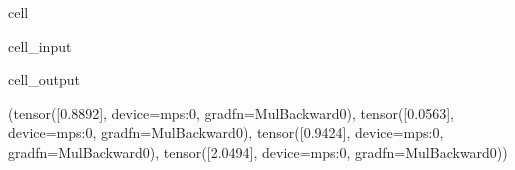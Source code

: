 \documentclass[letterpaper,10pt,english]{jupyterBook}
\begin{document}
\begin{sphinxuseclass}{cell}\begin{sphinxVerbatimInput}

\begin{sphinxuseclass}{cell_input}
\begin{sphinxVerbatim}[commandchars=\\\{\}]
              
              
          
          

   
\end{sphinxVerbatim}

\end{sphinxuseclass}\end{sphinxVerbatimInput}
\begin{sphinxVerbatimOutput}

\begin{sphinxuseclass}{cell_output}
\begin{sphinxVerbatim}[commandchars=\\\{\}]
(tensor([\PYGZhy{}0.8892], device=\PYGZsq{}mps:0\PYGZsq{}, grad\PYGZus{}fn=\PYGZlt{}MulBackward0\PYGZgt{}),
 tensor([\PYGZhy{}0.0563], device=\PYGZsq{}mps:0\PYGZsq{}, grad\PYGZus{}fn=\PYGZlt{}MulBackward0\PYGZgt{}),
 tensor([0.9424], device=\PYGZsq{}mps:0\PYGZsq{}, grad\PYGZus{}fn=\PYGZlt{}MulBackward0\PYGZgt{}),
 tensor([2.0494], device=\PYGZsq{}mps:0\PYGZsq{}, grad\PYGZus{}fn=\PYGZlt{}MulBackward0\PYGZgt{}))
\end{sphinxVerbatim}

\end{sphinxuseclass}\end{sphinxVerbatimOutput}

\end{sphinxuseclass}
\sphinxAtStartPar
{}
\end{document}
